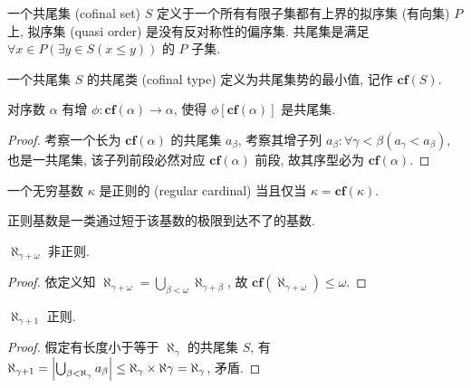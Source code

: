 \begin{definition}
    \label {definition:cofinal set}
    一个共尾集 (cofinal set) \(S\) 定义于一个所有有限子集都有上界的拟序集 (有向集) \(P\) 上, 拟序集 (quasi order) 是没有反对称性的偏序集.
    共尾集是满足 \(\forall x \in P (\exists y \in S (x \le y))\) 的 \(P\) 子集.
\end{definition}

\begin{definition}
    \label {definition:confinal type}
    一个共尾集 \(S\) 的共尾类 (cofinal type) 定义为共尾集势的最小值, 记作 \(\mathbf{cf} (S)\).
\end{definition}

\begin{lemma}
    对序数 \(\alpha\) 有增 \(\phi : \mathbf{cf} (\alpha) \to \alpha\), 使得 \(\phi[\mathbf{cf} (\alpha)]\) 是共尾集.

    \begin{proof}
        考察一个长为 \(\mathbf{cf} (\alpha)\) 的共尾集 \(a_\beta\), 考察其增子列
        \(a_\beta : \forall \gamma < \beta (a_\gamma < a_\beta)\), 也是一共尾集,
        该子列前段必然对应 \(\mathbf{cf} (\alpha)\) 前段, 故其序型必为 \(\mathbf{cf} (\alpha)\).
    \end{proof}
\end{lemma}

\begin{definition}
    \label {definition:regular cardinal}
    一个无穷基数 \(\kappa\) 是正则的 (regular cardinal) 当且仅当 \(\kappa = \mathbf{cf} (\kappa)\).
\end{definition}

正则基数是一类通过短于该基数的极限到达不了的基数.

\begin{example}
    \(\aleph_{\gamma + \omega}\) 非正则.

    \begin{proof}
        依定义知 \(\aleph_{\gamma + \omega} = \bigcup_{\beta < \omega} \aleph_{\gamma + \beta}\), 故 \(\mathbf{cf} (\aleph_{\gamma + \omega}) \le \omega\).
    \end{proof}
\end{example}

\begin{example}
    \(\aleph_{\gamma + 1}\) 正则.

    \begin{proof}
        假定有长度小于等于 \(\aleph_{\gamma}\) 的共尾集 \(S\), 有
        \(\aleph_{\gamma + 1} = \abs{\bigcup_{\beta < \aleph_\gamma} a_\beta} \le \aleph_\gamma \times \aleph \gamma = \aleph_\gamma\),
        矛盾.
    \end{proof}
\end{example}

